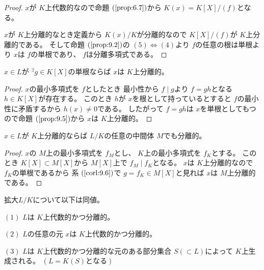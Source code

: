 \documentclass[../master_galois_theory]{subfiles}
\begin{document}
\begin{proof}
  $x$が $K$上代数的なので命題 $(\mathrm{\ref{prop:6.7}})$から
  $K(x) = K[X]/(f)$となる。

  $x$が $K$上分離的なとき定義から $K(x)/K$が分離的なので
  $K[X]/(f)$が $K$上分離的である。
  そして命題 $(\mathrm{\ref{prop:9.2}})$の $(5) \Leftrightarrow (4)$より $f$の任意の根は単根より $x$は $f$の単根であり、
  $f$は分離多項式である。
\end{proof}

\begin{corl} \label{corl:9.6}
  $x \in L$が ${}^\exists g \in K[X]$の単根ならば $x$は $K$上分離的。
\end{corl}

\begin{proof}
  $x$の最小多項式を $f$としたとき
  最小性から $f \mid g$より $f = gh$となる $h \in K[X]$が存在する。
  このとき $h$が $x$を根として持っているとすると $f$の最小性に矛盾するから
  $h(x) \neq 0$である。
  したがって $f = gh$は $x$を単根としてもつので命題 $(\mathrm{\ref{prop:9.5}})$から $x$は $K$上分離的。
\end{proof}

\begin{corl} \label{corl:9.7}
  $x \in L$が $K$上分離的ならば $L/K$の任意の中間体 $M$でも分離的。
\end{corl}

\begin{proof}
  $x$の $M$上の最小多項式を $f_M$とし、
  $K$上の最小多項式を $f_K$とする。
  このとき $K[X] \subset M[X]$から $M[X]$上で $f_M \mid f_K$となる。
  $x$は $K$上分離的なので $f_K$の単根であるから
  系 $(\mathrm{\ref{corl:9.6}})$で $g = f_K \in M[X]$と見れば
  $x$は $M$上分離的である。
\end{proof}

\begin{prop} \label{prop:7.3.6}
  拡大$L/K$について以下は同値。

  $(1)$
  $L$は $K$上代数的かつ分離的。

  $(2)$
  $L$の任意の元 $x$は $K$上代数的かつ分離的。

  $(3)$
  $L$は $K$上代数的かつ分離的な元のある部分集合 $S (\subset L)$によって $K$上生成される。
  $(L = K(S)となる)$
\end{prop}
\end{document}
